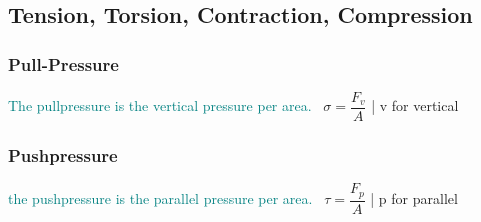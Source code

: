 \documentclass[main.tex,fontsize=8pt,paper=a4,paper=portrait,DIV=calc,]{scrartcl}
\begin{document}
\begin{multicols*}{2}
\begin{itemize}
\end{itemize} 

\subsection{Tension, Torsion, Contraction, Compression}
\subsubsection{Pull-Pressure} 
\textcolor{teal}{The pullpressure is the vertical pressure per area.}\newline
\, \newline
\large \( \sigma = \dfrac{F_v}{A} \) | v for vertical\newline
\normalsize 

\subsubsection{Pushpressure} 
\textcolor{teal}{the pushpressure is the parallel pressure per area.}\newline
\, \newline
\large \( \tau = \dfrac{F_p}{A} \) | p for parallel\newline
\normalsize 


\end{multicols*}
\end{document}
